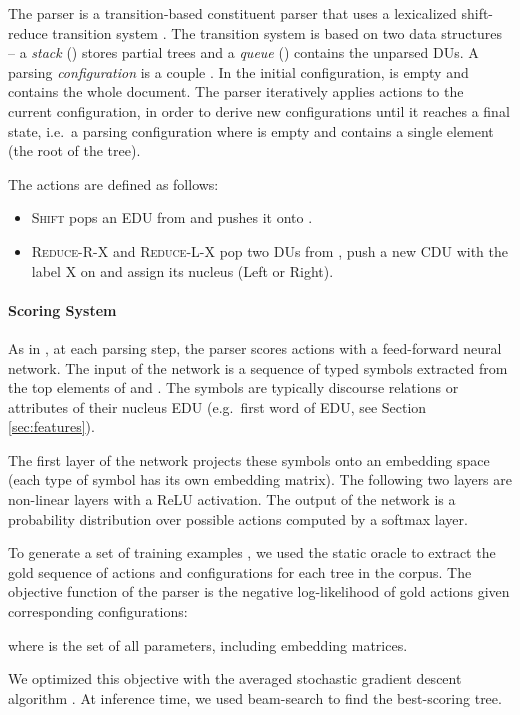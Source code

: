 \documentclass[11pt]{article}
\begin{document}
The parser is a transition-based constituent parser that uses a lexicalized shift-reduce transition system \cite{sagae-2005}.
The transition system is based on two data structures -- a \textit{stack} () stores partial trees and a \textit{queue} () contains the unparsed DUs.
A parsing \textit{configuration} is a couple .
In the initial configuration,  is empty and  contains the whole document.
The parser iteratively applies actions to the current configuration, in order
to derive new configurations until it reaches a final state, i.e.\ a parsing
configuration where  is empty and  contains a single element (the root of the tree).

The actions are defined as follows:
\begin{itemize}
    \item \textsc{Shift} pops an EDU from  and pushes it onto .
    \item \textsc{Reduce-R-X} and \textsc{Reduce-L-X} pop two DUs from , push a new CDU with the label X on  and assign its nucleus (Left or Right).
\end{itemize}



\paragraph{Scoring System} As in , at each parsing step,
the parser scores actions with a feed-forward neural network.
The input of the network is a sequence of typed symbols extracted
from the top elements of  and .
The symbols are typically discourse relations or attributes of their nucleus EDU (e.g.\ first word of EDU, see Section \ref{sec:features}).

The first layer of the network projects these symbols onto an embedding
space (each type of symbol has its own embedding matrix).
The following two layers are non-linear layers with a ReLU activation.
The output of the network is a probability distribution over
possible actions computed by a softmax layer.

To generate a set of training examples ,
we used the static oracle to extract the gold sequence of actions and configurations for each tree in the corpus.
The objective function of the parser is the negative
log-likelihood of gold actions given corresponding configurations:

where  is the set of all parameters, including embedding matrices.

We optimized this objective with the averaged stochastic gradient descent algorithm \cite{polyak-1992}.
At inference time, we used beam-search to find the best-scoring tree.
\end{document}

